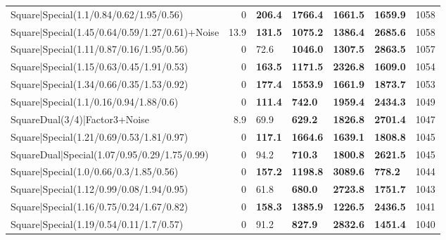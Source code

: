 \begin{tabular}{lrllllr}
 Square|Special(1.1/0.84/0.62/1.95/0.56)                       &             0   & \textbf{206.4} & \textbf{1766.4} & \textbf{1661.5} & \textbf{1659.9} &         1058 \\
 Square|Special(1.45/0.64/0.59/1.27/0.61)+Noise                &            13.9 & \textbf{131.5} & \textbf{1075.2} & \textbf{1386.4} & \textbf{2685.6} &         1058 \\
 Square|Special(1.11/0.87/0.16/1.95/0.56)                      &             0   & 72.6           & \textbf{1046.0} & \textbf{1307.5} & \textbf{2863.5} &         1057 \\
 Square|Special(1.15/0.63/0.45/1.91/0.53)                      &             0   & \textbf{163.5} & \textbf{1171.5} & \textbf{2326.8} & \textbf{1609.0} &         1054 \\
 Square|Special(1.34/0.66/0.35/1.53/0.92)                      &             0   & \textbf{177.4} & \textbf{1553.9} & \textbf{1661.9} & \textbf{1873.7} &         1053 \\
 Square|Special(1.1/0.16/0.94/1.88/0.6)                        &             0   & \textbf{111.4} & \textbf{742.0}  & \textbf{1959.4} & \textbf{2434.3} &         1049 \\
 SquareDual(3/4)|Factor3+Noise                                 &             8.9 & 69.9           & \textbf{629.2}  & \textbf{1826.8} & \textbf{2701.4} &         1047 \\
 Square|Special(1.21/0.69/0.53/1.81/0.97)                      &             0   & \textbf{117.1} & \textbf{1664.6} & \textbf{1639.1} & \textbf{1808.8} &         1045 \\
 SquareDual|Special(1.07/0.95/0.29/1.75/0.99)                  &             0   & 94.2           & \textbf{710.3}  & \textbf{1800.8} & \textbf{2621.5} &         1045 \\
 Square|Special(1.0/0.66/0.3/1.85/0.56)                        &             0   & \textbf{157.2} & \textbf{1198.8} & \textbf{3089.6} & \textbf{778.2}  &         1044 \\
 Square|Special(1.12/0.99/0.08/1.94/0.95)                      &             0   & 61.8           & \textbf{680.0}  & \textbf{2723.8} & \textbf{1751.7} &         1043 \\
 Square|Special(1.16/0.75/0.24/1.67/0.82)                      &             0   & \textbf{158.3} & \textbf{1385.9} & \textbf{1226.5} & \textbf{2436.5} &         1041 \\
 Square|Special(1.19/0.54/0.11/1.7/0.57)                       &             0   & 91.2           & \textbf{827.9}  & \textbf{2832.6} & \textbf{1451.4} &         1040 \\

\end{tabular}
